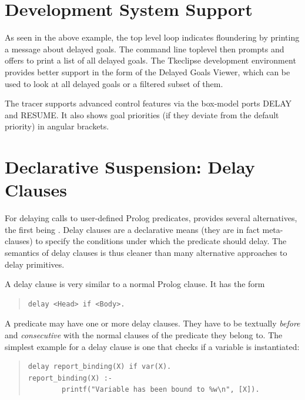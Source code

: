 {%
\section{Development System Support}

As seen in the above example, the  top level loop
indicates floundering by printing a message about delayed goals.
The command line toplevel then prompts and offers to print a list of
all delayed goals.
The Tkeclipse development environment provides better support in the form
of the Delayed Goals Viewer, which can be used to look at all delayed goals
or a filtered subset of them.

The tracer supports advanced control features via
the box-model ports DELAY and RESUME.
It also shows goal priorities (if they deviate from the default priority)
in angular brackets.


\section{Declarative Suspension: Delay Clauses}

For delaying calls to user-defined Prolog predicates, {\eclipse}
 provides several alternatives, the first being .
Delay clauses are a declarative means (they are in fact meta-clauses)
to specify the conditions under which the predicate should delay.
The semantics of delay clauses is thus cleaner than many alternative
approaches to delay primitives.

A delay clause is very similar to a normal Prolog clause. It has the form
\begin{quote}
\begin{verbatim}
delay <Head> if <Body>.
\end{verbatim}
\end{quote}
A predicate may have one or more delay clauses.
They have to be textually \emph{before} and \emph{consecutive}
with the normal clauses of the predicate they belong to.
The simplest example for a delay clause is one that checks if a variable
is instantiated:
\begin{quote}
\begin{verbatim}
delay report_binding(X) if var(X).
report_binding(X) :-
        printf("Variable has been bound to %w\n", [X]).
\end{verbatim}
\end{quote}

}

